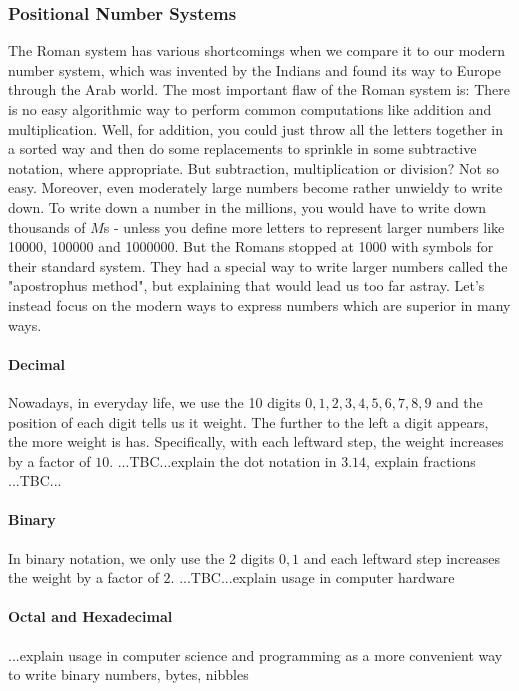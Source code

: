 \subsubsection{Positional Number Systems}
The Roman system has various shortcomings when we compare it to our modern number system, which was invented by the Indians and found its way to Europe through the Arab world. The most important flaw of the Roman system is: There is no easy algorithmic way to perform common computations like addition and multiplication. Well, for addition, you could just throw all the letters together in a sorted way and then do some replacements to sprinkle in some subtractive notation, where appropriate. But subtraction, multiplication or division? Not so easy. Moreover, even moderately large numbers become rather unwieldy to write down. To write down a number in the millions, you would have to write down thousands of $M$s - unless you define more letters to represent larger numbers like 10000, 100000 and 1000000. But the Romans stopped at 1000 with symbols for their standard system. They had a special way to write larger numbers called the "apostrophus method", but explaining that would lead us too far astray. Let's instead focus on the modern ways to express numbers which are superior in many ways.



\paragraph{Decimal}
Nowadays, in everyday life, we use the 10 digits $0,1,2,3,4,5,6,7,8,9$ and the position of each digit tells us it weight. The further to the left a digit appears, the more weight is has. Specifically, with each leftward step, the weight increases by a factor of $10$. ...TBC...explain the dot notation in $3.14$, explain fractions ...TBC...




\paragraph{Binary}
In binary notation, we only use the 2 digits $0,1$ and each leftward step increases the weight by a factor of $2$. ...TBC...explain usage in computer hardware

\paragraph{Octal and Hexadecimal}
...explain usage in computer science and programming as a more convenient way to write binary numbers, bytes, nibbles


